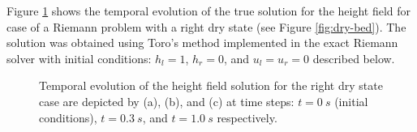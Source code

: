 \documentclass[10pt,a4paper]{article}
\begin{document}
	Figure \ref{right}  shows the temporal evolution of the true solution  for the height field for case of a Riemann problem with a right dry state (see Figure \ref{fig:dry-bed}). The solution was obtained using Toro's method implemented in the exact Riemann solver with initial conditions: $h_l  = 1$, $h_r = 0$, and  $u_l = u_r = 0$ described  below.
	\begin{figure}[H]
		\hfill
		\caption{Temporal evolution of the height field solution for the right dry state case  are depicted by (a), (b), and (c) at time steps: $t=0~s$ (initial conditions), $t = 0.3~s$, and $t = 1.0~s$ respectively. }
		\label{right}
	\end{figure}
	
\end{document}
